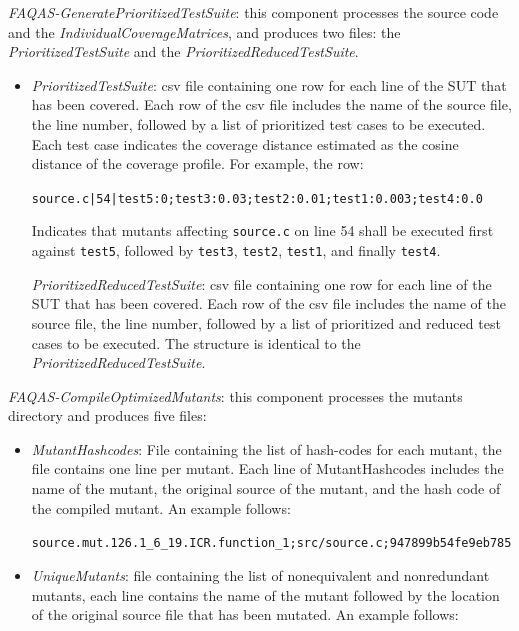 \begin{itemize}
{	\item \textit{FAQAS-GeneratePrioritizedTestSuite}: this component processes the source code and the \textit{IndividualCoverageMatrices}, and produces two files: the \textit{PrioritizedTestSuite} and the \textit{PrioritizedReducedTestSuite}.

	\begin{itemize}
		\item \textit{PrioritizedTestSuite}: csv file containing one row for each line of the SUT that has been covered. Each row of the csv file includes the name of the source file, the line number, followed by a list of prioritized test cases to be executed. Each test case indicates the coverage distance estimated as the cosine distance of the coverage profile. For example, the row:

		\texttt{source.c|54|test5:0;test3:0.03;test2:0.01;test1:0.003;test4:0.0}

		Indicates that mutants affecting \texttt{source.c} on line 54 shall be executed first against \texttt{test5}, followed by \texttt{test3}, \texttt{test2}, \texttt{test1}, and finally \texttt{test4}.

		\textit{PrioritizedReducedTestSuite}: csv file containing one row for each line of the SUT that has been covered. Each row of the csv file includes the name of the source file, the line number, followed by a list of prioritized and reduced test cases to be executed. The structure is identical to the \textit{PrioritizedReducedTestSuite}.
	\end{itemize}

	\item \textit{FAQAS-CompileOptimizedMutants}: this component processes the mutants directory and produces five files:
	\begin{itemize}
		\item \textit{MutantHashcodes}: File containing the list of hash-codes for each mutant, the file contains one line per mutant. Each line of MutantHashcodes includes the name of the mutant, the original source of the mutant, and the hash code of the compiled mutant. An example follows:

		\texttt{source.mut.126.1\_6\_19.ICR.function\_1;src/source.c;947899b54fe9eb785}

		\item \textit{UniqueMutants}: file containing the list of nonequivalent and nonredundant mutants, each line contains the name of the mutant followed by the location of the original source file that has been mutated. An example follows:


\end{itemize}}
\end{itemize}
